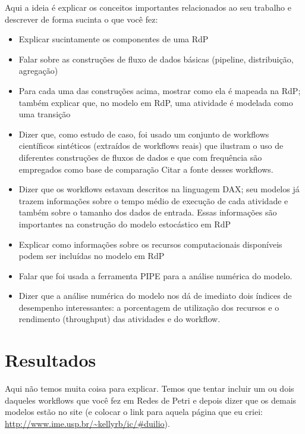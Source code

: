 \documentclass[a4paper,10pt]{article}
\begin{document}
Aqui a ideia é explicar os conceitos importantes relacionados ao seu trabalho e descrever de forma sucinta o que você fez:

\begin{itemize}

	\item Explicar sucintamente os componentes de uma RdP

	\item Falar sobre as construções de fluxo de dados básicas (pipeline, distribuição, agregação)

	\item Para cada uma das construções acima, mostrar como ela é mapeada na RdP; também explicar que, no modelo em RdP, uma atividade é modelada como uma transição

	\item Dizer que, como estudo de caso, foi usado um conjunto de workflows científicos sintéticos (extraídos de workflows reais) que ilustram o uso de diferentes construções de fluxos de dados e que com frequência são empregados como base de comparação Citar a fonte desses workflows.  

	\item Dizer que os workflows estavam descritos na linguagem DAX; seu modelos já trazem informações sobre o tempo médio de execução de cada atividade e também sobre o tamanho dos dados de entrada. Essas informações são importantes na construção do modelo estocástico em RdP

	\item Explicar como informações sobre os recursos computacionais disponíveis podem ser incluídas no modelo em RdP

	\item Falar que foi usada a ferramenta PIPE para a análise numérica do modelo.

	\item Dizer que a análise numérica do modelo nos dá de imediato dois índices de desempenho interessantes: a porcentagem de utilização dos recursos e o rendimento (throughput) das atividades e do workflow.    

\end{itemize}

\section*{Resultados}

Aqui não temos muita coisa para explicar.
Temos que tentar incluir um ou dois daqueles workflows que você fez em Redes de Petri e depois dizer que os demais modelos estão no site (e colocar o link para aquela página que eu criei: \url{http://www.ime.usp.br/~kellyrb/ic/#duilio}).
\end{document}

